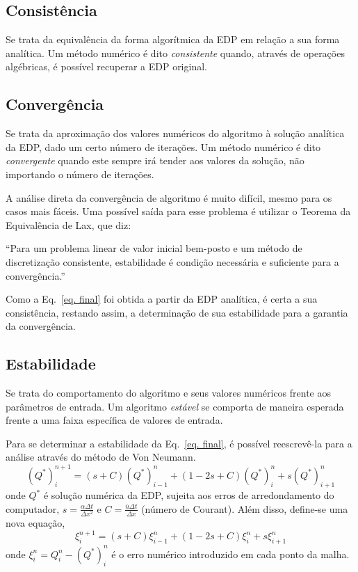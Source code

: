 \subsection{Consistência}
Se trata da equivalência da forma algorítmica da EDP em relação a sua forma
analítica. Um método numérico é dito \emph{consistente} quando, através
de operações algébricas, é possível recuperar a EDP original.

\subsection{Convergência}
Se trata da aproximação dos valores numéricos do algoritmo à solução analítica
da EDP, dado um certo número de iterações. Um método numérico é dito
\emph{convergente} quando este sempre irá tender aos valores da solução, não
importando o número de iterações.

A análise direta da convergência de algoritmo é muito difícil, mesmo para os
casos mais fáceis. Uma possível saída para esse problema é utilizar o Teorema
da Equivalência de Lax, que diz:
\begin{displayquote}
    ``Para um problema linear de valor inicial bem-posto e um método de
    discretização consistente, estabilidade é condição necessária e suficiente
    para a convergência.''
\end{displayquote}
Como a Eq.\ \ref{eq. final} foi obtida a partir da EDP analítica, é certa a
sua consistência, restando assim, a determinação de sua estabilidade para a
garantia da convergência.

\subsection{Estabilidade}
Se trata do comportamento do algoritmo e seus valores numéricos frente aos
parâmetros de entrada. Um algoritmo \emph{estável} se comporta de maneira
esperada frente a uma faixa específica de valores de entrada.

Para se determinar a estabilidade da Eq.\ \ref{eq. final}, é possível
reescrevê-la para a análise através do método de Von Neumann.
\begin{equation}
    (Q^*)_i^{n+1} = (s + C)(Q^*)_{i-1}^n + (1 - 2s + C)(Q^*)_i^n +
    s(Q^*)_{i+1}^n
\end{equation}
onde $Q^*$ é solução numérica da EDP, sujeita aos erros de arredondamento do
computador, $s = \frac{\alpha\Delta t}{\Delta x^2}$ e $C = \frac{\bar{u}\Delta
t}{\Delta x}$ (número de Courant). Além disso, define-se uma nova equação,
\begin{equation}\label{eq. final erro}
    \xi_i^{n+1} = (s + C)\xi_{i-1}^n + (1 - 2s + C)\xi_i^n + s\xi_{i+1}^n
\end{equation}
onde $\xi_i^n = Q_i^n - (Q^*)_i^n$ é o erro numérico introduzido em cada ponto
da malha.

